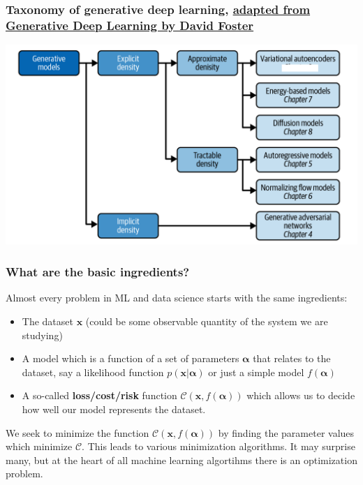 \documentclass{beamer}
\begin{document}
\begin{frame}
\frametitle{Taxonomy of generative deep learning, \href{{https://www.oreilly.com/library/view/generative-deep-learning/9781098134174/ch01.html}}{adapted from Generative Deep Learning by David Foster}}

\vspace{6mm}

\centerline{\includegraphics[width=1.0\linewidth]{figures/generativemodels.png}}

\vspace{6mm}
\end{frame}

\begin{frame}
\frametitle{What are the basic ingredients?}

\begin{block}{}
Almost every problem in ML and data science starts with the same ingredients:
\begin{itemize}
\item The dataset $\mathbf{x}$ (could be some observable quantity of the system we are studying)

\item A model which is a function of a set of parameters $\mathbf{\alpha}$ that relates to the dataset, say a likelihood  function $p(\mathbf{x}\vert \mathbf{\alpha})$ or just a simple model $f(\mathbf{\alpha})$

\item A so-called \textbf{loss/cost/risk} function $\mathcal{C} (\mathbf{x}, f(\mathbf{\alpha}))$ which allows us to decide how well our model represents the dataset. 
\end{itemize}

\noindent
We seek to minimize the function $\mathcal{C} (\mathbf{x}, f(\mathbf{\alpha}))$ by finding the parameter values which minimize $\mathcal{C}$. This leads to  various minimization algorithms. It may surprise many, but at the heart of all machine learning algortihms there is an optimization problem. 
\end{block}
\end{frame}
\end{document}
